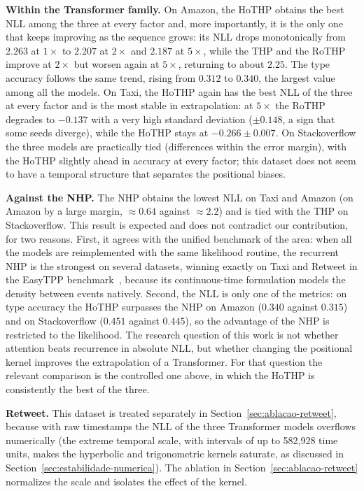\textbf{Within the Transformer family.} On Amazon, the HoTHP obtains the best NLL among the three at every factor and, more importantly, it is the only one that keeps improving as the sequence grows: its NLL drops monotonically from $2.263$ at $1\times$ to $2.207$ at $2\times$ and $2.187$ at $5\times$, while the THP and the RoTHP improve at $2\times$ but worsen again at $5\times$, returning to about $2.25$. The type accuracy follows the same trend, rising from $0.312$ to $0.340$, the largest value among all the models. On Taxi, the HoTHP again has the best NLL of the three at every factor and is the most stable in extrapolation: at $5\times$ the RoTHP degrades to $-0.137$ with a very high standard deviation ($\pm 0.148$, a sign that some seeds diverge), while the HoTHP stays at $-0.266 \pm 0.007$. On Stackoverflow the three models are practically tied (differences within the error margin), with the HoTHP slightly ahead in accuracy at every factor; this dataset does not seem to have a temporal structure that separates the positional biases.

\textbf{Against the NHP.} The NHP obtains the lowest NLL on Taxi and Amazon (on Amazon by a large margin, $\approx 0.64$ against $\approx 2.2$) and is tied with the THP on Stackoverflow. This result is expected and does not contradict our contribution, for two reasons. First, it agrees with the unified benchmark of the area: when all the models are reimplemented with the same likelihood routine, the recurrent NHP is the strongest on several datasets, winning exactly on Taxi and Retweet in the EasyTPP benchmark~\cite{xue_easytpp_2024}, because its continuous-time formulation models the density between events natively. Second, the NLL is only one of the metrics: on type accuracy the HoTHP surpasses the NHP on Amazon ($0.340$ against $0.315$) and on Stackoverflow ($0.451$ against $0.445$), so the advantage of the NHP is restricted to the likelihood. The research question of this work is not whether attention beats recurrence in absolute NLL, but whether changing the positional kernel improves the extrapolation of a Transformer. For that question the relevant comparison is the controlled one above, in which the HoTHP is consistently the best of the three.

\textbf{Retweet.} This dataset is treated separately in Section~\ref{sec:ablacao-retweet}, because with raw timestamps the NLL of the three Transformer models overflows numerically (the extreme temporal scale, with intervals of up to 582,928 time units, makes the hyperbolic and trigonometric kernels saturate, as discussed in Section~\ref{sec:estabilidade-numerica}). The ablation in Section~\ref{sec:ablacao-retweet} normalizes the scale and isolates the effect of the kernel.

